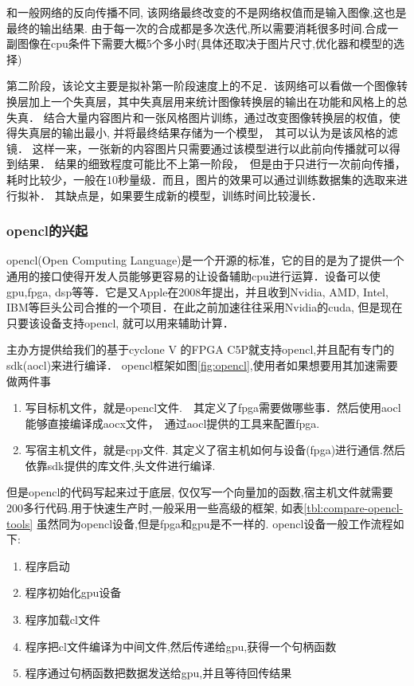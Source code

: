 和一般网络的反向传播不同, 该网络最终改变的不是网络权值而是输入图像,这也是最终的输出结果.
由于每一次的合成都是多次迭代,所以需要消耗很多时间.合成一副图像在cpu条件下需要大概5个多小时(具体还取决于图片尺寸,优化器和模型的选择)

第二阶段，该论文主要是拟补第一阶段速度上的不足．该网络可以看做一个图像转换层加上一个失真层，其中失真层用来统计图像转换层的输出在功能和风格上的总失真．
结合大量内容图片和一张风格图片训练，通过改变图像转换层的权值，使得失真层的输出最小, 并将最终结果存储为一个模型，　其可以认为是该风格的滤镜．
这样一来，一张新的内容图片只需要通过该模型进行以此前向传播就可以得到结果．
结果的细致程度可能比不上第一阶段，　但是由于只进行一次前向传播，耗时比较少，一般在10秒量级．而且，图片的效果可以通过训练数据集的选取来进行拟补．
其缺点是，如果要生成新的模型，训练时间比较漫长．

\subsubsection{opencl的兴起}\label{sec:opencl}
 opencl(Open Computing Language)是一个开源的标准，它的目的是为了提供一个通用的接口使得开发人员能够更容易的让设备辅助cpu进行运算．设备可以使gpu,fpga, dsp等等．它是又Apple在2008年提出，并且收到Nvidia, AMD, Intel, IBM等巨头公司合推的一个项目．在此之前加速往往采用Nvidia的cuda, 但是现在只要该设备支持opencl, 就可以用来辅助计算．

主办方提供给我们的基于cyclone V 的FPGA C5P就支持opencl,并且配有专门的sdk(aocl)来进行编译．
opencl框架如图\ref{fig:opencl},使用者如果想要用其加速需要做两件事
\begin{enumerate}
  \item 写目标机文件，就是opencl文件.　其定义了fpga需要做哪些事．然后使用aocl能够直接编译成aocx文件，　通过aocl提供的工具来配置fpga.
  \item 写宿主机文件，就是cpp文件. 其定义了宿主机如何与设备(fpga)进行通信.然后依靠sdk提供的库文件,头文件进行编译.
\end{enumerate}

但是opencl的代码写起来过于底层, 仅仅写一个向量加的函数,宿主机文件就需要200多行代码.用于快速生产时,一般采用一些高级的框架, 如表\ref{tbl:compare-opencl-tools}
虽然同为opencl设备,但是fpga和gpu是不一样的.
opencl设备一般工作流程如下:
\begin{enumerate}
  \item 程序启动
  \item 程序初始化gpu设备
  \item	程序加载cl文件
  \item	程序把cl文件编译为中间文件,然后传递给gpu,获得一个句柄函数
  \item 程序通过句柄函数把数据发送给gpu,并且等待回传结果
\end{enumerate}

